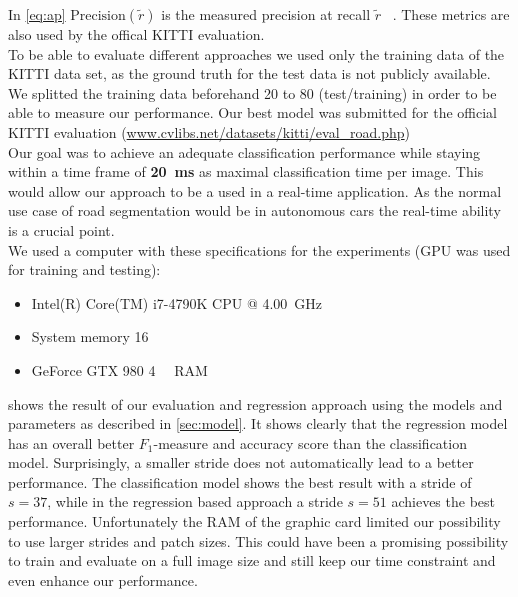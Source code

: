%  
In \cref{eq:ap}  $\text{Precision}(\tilde{r})$ is the measured precision at recall $\tilde{r}$ ~\cite{everingham2010pascal}. These metrics are also used by the offical KITTI evaluation. \\
To be able to evaluate different approaches we used only the
training data of the KITTI data set, as the ground truth for the test data is
not publicly available. We splitted the training data beforehand 20 to 80
(test/training) in order to be able to measure our performance. Our best model
was submitted for the official KITTI evaluation
(\href{http://www.cvlibs.net/datasets/kitti/eval_road.php}{www.cvlibs.net/datasets/kitti/eval\_road.php})\\

Our goal was to achieve an adequate classification performance while staying
within a time frame of \textbf{\SI{20}{\milli\second}} as maximal
classification time per image. This would allow our approach to be a used in a real-time application. 
As the normal use case of road segmentation would be in autonomous cars the real-time ability is a crucial point.\\

We used a computer with these specifications for the experiments (GPU was used
for training and testing):
\begin{itemize}
    \item Intel(R) Core(TM) i7-4790K CPU @ \SI{4.00}{\giga\hertz}
    \item System memory \SI{16}{\gibi\byte}
    \item GeForce GTX 980 \SI{4}{\gibi\byte} RAM
\end{itemize}

 shows the result of our evaluation and regression
approach using the models and parameters as described in \cref{sec:model}. 
It shows clearly that the regression model has an
overall better $F_1$-measure and accuracy score than the classification model.
Surprisingly, a smaller stride does not automatically lead to a better
performance. The classification model shows  the best result with a stride of $s=37$, 
while in the regression based approach a stride $s=51$ achieves the
best performance. Unfortunately the RAM of the graphic card limited our
possibility to use larger strides and patch sizes. This could have been a
promising possibility to train and evaluate on a full image size and still keep
our time constraint and even enhance our performance.\\

